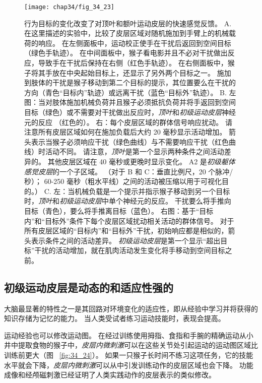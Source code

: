 \begin{figure}[htbp]
	\centering
	\texttt{[image: chap34/fig\_34\_23]}
	\caption{行为目标的变化改变了对顶叶和额叶运动皮层的快速感觉反馈。
		A. 在这里描述的实验中，比较了皮层区域对随机施加到手臂上的机械载荷的响应。
		在左侧面板中，运动校正使手在干扰后返回到空间目标（绿色手轨迹）。
		在中间面板中，猴子看电影并且不必对干扰做出反应，导致手在干扰后保持在右侧（红色手轨迹）。
		在右侧面板中，猴子将其手放在中央起始目标上，还显示了另外两个目标之一。
		施加到肢体的干扰是猴子移动到第二个目标的提示，其位置要么在干扰的方向（青色“目标内”轨迹）或远离干扰（蓝色“目标外”轨迹）。
		B. 左图：当对肢体施加机械负荷并且猴子必须抵抗负荷并将手返回到空间目标（绿色）或不需要对干扰做出反应时，\textit{顶叶}和\textit{初级运动皮层}神经元的反应 （红色的）。
		右：每个皮层区域的群体信号响应扰动。 请注意所有皮层区域如何在施加负载后大约 20 毫秒显示活动增加。
		箭头表示当猴子必须响应干扰（绿色曲线）与不需要响应干扰（红色曲线）时活动不同。
		请注意，\textit{顶叶}是第一个显示两种条件之间活动差异的。 
		其他皮层区域在 40 毫秒或更晚时显示变化。
		A2 是\textit{初级躯体感觉皮层}的一个子区域。 （对于 B 和 C：垂直比例尺，20 个脉冲/秒）；
		60-250 毫秒（粗水平线）之间的活动被压缩以用于可视化目的。）
		C. 左：当机械负载是一个提示并指示猴子移动到另一个目标时，\textit{顶叶}和\textit{初级运动皮层}中单个神经元的反应。
		干扰要么将手推向目标（青色），要么将手推离目标（蓝色）。
		右图：基于“目标内”和“目标外”条件下每个皮层区域扰动相关活动的群体信号。
		对于所有皮层区域的“目标内”和“目标外”干扰，初始响应都是相似的，箭头表示条件之间的活动差异。
		\textit{初级运动皮层}是第一个显示“超出目标”干扰的活动增加，就在肌肉活动发生变化将手移动到空间目标之前。}
	\label{fig:34_23}
\end{figure}


\subsection{初级运动皮层是动态的和适应性强的}

大脑最显著的特性之一是其回路对环境变化的适应性，即从经验中学习并将获得的知识存储为记忆的能力。
当人类受试者练习运动技能时，表现会提高。


运动经验也可以修改运动图。
在经过训练使用拇指、食指和手腕的精确运动从小井中提取食物的猴子中，\textit{皮层内微刺激}可以在这些关节处引起运动的运动图区域比训练前更大（图 ~\ref{fig:34_24}）。
如果一只猴子长时间不练习这项任务，它的技能水平就会下降，\textit{皮层内微刺激}可以从中引发训练动作的皮层区域也会下降。
功能成像和经颅磁刺激已经证明了人类实践动作的皮层表示的类似修改。


